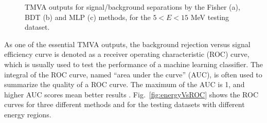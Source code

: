 \begin{figure}[htbp]
	\centering
	\caption[TMVA outputs for signal/background separations by different methods.]{TMVA outputs for signal/background separations by the Fisher (a), BDT (b) and MLP (c) methods, for the $5<E<15$ MeV testing dataset.\label{output_separation_allE}}
\end{figure}
As one of the essential TMVA outputs, the background rejection versus signal efficiency curve is denoted as a receiver operating characteristic (ROC) curve, which is usually used to test the performance of a machine learning classifier. The integral of the ROC curve, named ``area under the curve'' (AUC), is often used to summarize the quality of a ROC curve. The maximum of the AUC is 1, and higher AUC scores mean better results \cite{murphy2012machine}. Fig.~\ref{fig:energyVsROC} shows the ROC curves for three different methods and for the testing datasets with different energy regions.

